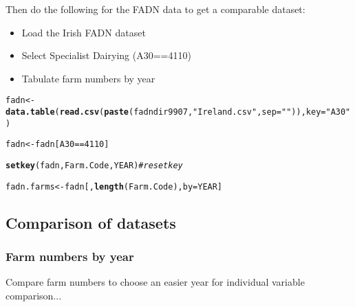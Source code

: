 \documentclass{article}\usepackage[]{graphicx}\usepackage[]{color}
\makeatletter
\newcommand{\hlstr}[1]{\textcolor[rgb]{0.192,0.494,0.8}{#1}}%
\newcommand{\hlcom}[1]{\textcolor[rgb]{0.678,0.584,0.686}{\textit{#1}}}%
\newcommand{\hlkwd}[1]{\textcolor[rgb]{0.737,0.353,0.396}{\textbf{#1}}}%
\newenvironment{kframe}{%
 \def\at@end@of@kframe{}%
 \ifinner\ifhmode%
  \def\at@end@of@kframe{\end{minipage}}%
  \begin{minipage}{\columnwidth}%
 \fi\fi%
 \def\FrameCommand##1{\hskip\@totalleftmargin \hskip-\fboxsep
 \colorbox{shadecolor}{##1}\hskip-\fboxsep
     \hskip-\linewidth \hskip-\@totalleftmargin \hskip\columnwidth}%
 \MakeFramed {\advance\hsize-\width
   \@totalleftmargin\z@ \linewidth\hsize
   \@setminipage}}%
 {\par\unskip\endMakeFramed%
 \at@end@of@kframe}
\newenvironment{knitrout}{}{} %
\makeatother
\begin{document}
\begin{flushleft}
Then do the following for the FADN data to get a comparable dataset: 
\begin{itemize}
  \item{Load the Irish FADN dataset}
  \item{Select Specialist Dairying (A30==4110)}
  \item{Tabulate farm numbers by year}
\end{itemize}
\begin{knitrout}
\color{fgcolor}\begin{kframe}
\begin{alltt}
fadn <- \hlkwd{data.table}(\hlkwd{read.csv}(\hlkwd{paste}(fadndir9907, \hlstr{"Ireland.csv"}, sep = \hlstr{""})), key = \hlstr{"A30"})
\end{alltt}


{\ttfamily\noindent{}}

{\ttfamily\noindent\bfseries\color{errorcolor}{\#\# Error: cannot open the connection}}\begin{alltt}
fadn <- fadn[A30 == 4110]
\end{alltt}


{\ttfamily\noindent\bfseries\color{errorcolor}{\#\# Error: object 'fadn' not found}}\begin{alltt}
\hlkwd{setkey}(fadn, Farm.Code, YEAR)  \hlcom{# reset key}
\end{alltt}


{\ttfamily\noindent\bfseries\color{errorcolor}{\#\# Error: object 'fadn' not found}}\begin{alltt}
fadn.farms <- fadn[, \hlkwd{length}(Farm.Code), by = YEAR]
\end{alltt}


{\ttfamily\noindent\bfseries\color{errorcolor}{\#\# Error: object 'fadn' not found}}\end{kframe}
\end{knitrout}


\subsection*{Comparison of datasets}
\subsubsection*{Farm numbers by year}
Compare farm numbers to choose an easier year for individual variable comparison... 


\end{flushleft}
\end{document}

